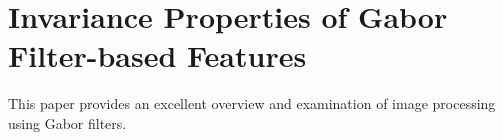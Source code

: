 \documentclass[letterpaper]{article}
\date{\today}
\begin{document}
\maketitle

\section{Invariance Properties of Gabor Filter-based Features}
This paper provides an excellent overview and examination of image
processing using Gabor filters.





\end{document}
